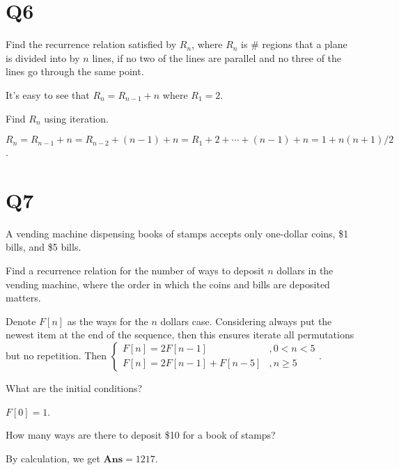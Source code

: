 \documentclass[a4paper,11pt]{article}
\begin{document}
\section*{Q6}
\begin{qparts}
    
    \item Find the recurrence relation satisﬁed by $R_n$, where $R_n$ is $\#$
    regions that a plane is divided into by $n$ lines, if no two of the
    lines are parallel and no three of the lines go through the same
    point.
    \begin{solution}
        It's easy to see that $R_{n}=R_{n-1}+n$ where $R_1=2$. 
    \end{solution}
    
    \item Find $R_n$ using iteration.
    \begin{solution}
        $R_{n}=R_{n-1}+n=R_{n-2}+(n-1)+n=R_1+2+ \cdots +(n-1)+n=1+n(n+1) / 2$.
    \end{solution}
\end{qparts}

\section*{Q7}
A vending machine dispensing books of stamps accepts only
one-dollar coins, \$1 bills, and \$5 bills.
\begin{qparts}
    
    \item Find a recurrence relation for the number of ways to deposit $n$
    dollars in the vending machine, where the order in which the
    coins and bills are deposited matters.
    \begin{solution}
        Denote $F[n]$ as the ways for the $n$ dollars case.
        Considering always put the newest item at the end of the sequence, then this ensures iterate all permutations but no repetition. Then $
        \begin{cases}
            F[n]=2F[n-1]&,0<n< 5\\
            F[n]=2F[n-1]+F[n-5]&,n\ge 5
        \end{cases}
        $.
    \end{solution}
    
    \item What are the initial conditions?
    \begin{solution}
        $F[0]=1$.
    \end{solution}
    \item How many ways are there to deposit \$10 for a book of stamps?
    \begin{solution}
        By calculation, we get $\textbf{Ans}=1217$.
    \end{solution}
\end{qparts}
\end{document}
